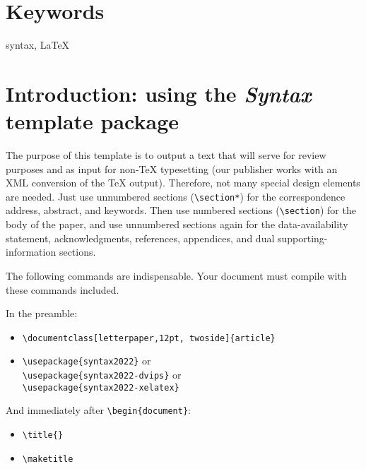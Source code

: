\documentclass[letterpaper,12pt, twoside]{article}
\begin{document}
\section*{Keywords}
syntax, LaTeX

\section{Introduction: using the \emph{Syntax} template package}
The purpose of this template is to output a text that will serve for review purposes and as input for non-TeX typesetting (our publisher works with an XML conversion of the TeX output). Therefore, not many special design elements are needed. Just use unnumbered sections (\verb|\section*|) for the correspondence address, abstract, and keywords. Then use numbered sections  (\verb|\section|) for the body of the paper, and use unnumbered sections again for the data-availability statement, acknowledgments, references, appendices, and dual supporting-information sections.

The following commands are indispensable. Your document must compile with these commands included.

In the preamble:

\begin{itemize}
\item \verb|\documentclass[letterpaper,12pt, twoside]{article}|
\item \verb|\usepackage{syntax2022}| or
\\ \noindent \verb|\usepackage{syntax2022-dvips}| or 
\\ \noindent \verb|\usepackage{syntax2022-xelatex}|
\end{itemize}

And immediately after \verb|\begin{document}|:

\begin{itemize}
\item\verb|\title{}|
\item\verb|\maketitle|
\end{itemize}
\end{document}
